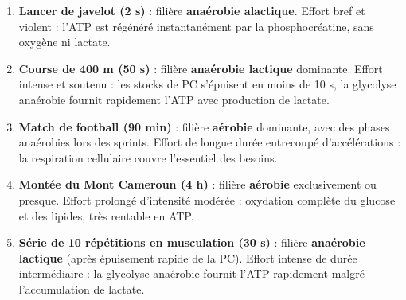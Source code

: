 \documentclass[11pt]{article}
\begin{document}
\begin{corrige}
\begin{enumerate}
\item \textbf{Lancer de javelot (2 s)} : filière \textbf{anaérobie alactique}. Effort bref et violent : l'ATP est régénéré instantanément par la phosphocréatine, sans oxygène ni lactate.
\item \textbf{Course de 400 m (50 s)} : filière \textbf{anaérobie lactique} dominante. Effort intense et soutenu : les stocks de PC s'épuisent en moins de 10 s, la glycolyse anaérobie fournit rapidement l'ATP avec production de lactate.
\item \textbf{Match de football (90 min)} : filière \textbf{aérobie} dominante, avec des phases anaérobies lors des sprints. Effort de longue durée entrecoupé d'accélérations : la respiration cellulaire couvre l'essentiel des besoins.
\item \textbf{Montée du Mont Cameroun (4 h)} : filière \textbf{aérobie} exclusivement ou presque. Effort prolongé d'intensité modérée : oxydation complète du glucose et des lipides, très rentable en ATP.
\item \textbf{Série de 10 répétitions en musculation (30 s)} : filière \textbf{anaérobie lactique} (après épuisement rapide de la PC). Effort intense de durée intermédiaire : la glycolyse anaérobie fournit l'ATP rapidement malgré l'accumulation de lactate.
\end{enumerate}
\end{corrige}
\end{document}
